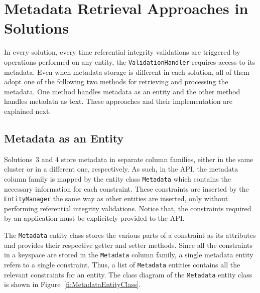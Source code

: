 \section{Metadata Retrieval Approaches in Solutions}
\label{s:implementation-MDinSolutions}

In every solution,  every time referential integrity validations are triggered
by operations  performed  on  any entity,  the
\texttt{ValidationHandler} requires access to its  metadata. Even when metadata
storage is different in each solution, all of them adopt  
 one of the following two methods for retrieving and processing the
metadata. One method handles metadata as an entity and the other method handles
metadata as text. These approaches and their implementation 
are explained next.


% 

 
\subsection{Metadata as an Entity} \label{ss:implementation-MDEntityClass}
Solutions~3 and 4 store  metadata in separate column families, either in the
same cluster or in a different one, respectively.  As such, in the \ac{API}, the
metadata column family is mapped by the entity class \texttt{Metadata} which contains the
necessary information for each constraint.  These constraints are inserted 
by the \texttt{EntityManager} the same way as other entities are inserted, only
without performing referential integrity validations. Notice that, the
constraints required by an application must be explicitely provided to the
\ac{API}.

 
The \texttt{Metadata} entity class stores the various parts of a constraint as
its attributes and provides their respective getter and setter methods.  Since
all the constraints in a keyspace are stored in the \texttt{Metadata} column
family, a single metadata entity refers to a single constraint. Thus, a list
of \texttt{Metadata} entities contains  all the relevant constraints for an
entity. The class diagram of the \texttt{Metadata} entity class is shown in
Figure~\ref{fi:MetadataEntityClass}.


